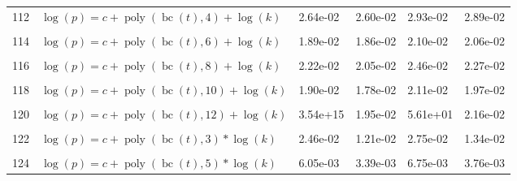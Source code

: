 \documentclass[12pt,a4paper]{article}
\DeclareMathOperator{\bc}{bc}
\DeclareMathOperator{\poly}{poly}
\begin{document}
\begin{longtable}[t]{ll>{\raggedleft\arraybackslash}p{2cm}>{\raggedleft\arraybackslash}p{2cm}>{\raggedleft\arraybackslash}p{2cm}>{\raggedleft\arraybackslash}p{2cm}}
112 & $\log(p) = c + \poly\left( \bc(t), 4 \right) + \log(k)$ & 2.64e-02 & 2.60e-02 & 2.93e-02 & 2.89e-02\\
\cellcolor{gray!6}{113} & \cellcolor{gray!6}{$\log(p) = c + \poly\left( \bc(t), 5 \right) + \log(k)$} & \cellcolor{gray!6}{2.09e-02} & \cellcolor{gray!6}{1.85e-02} & \cellcolor{gray!6}{2.32e-02} & \cellcolor{gray!6}{2.05e-02}\\
114 & $\log(p) = c + \poly\left( \bc(t), 6 \right) + \log(k)$ & 1.89e-02 & 1.86e-02 & 2.10e-02 & 2.06e-02\\
\cellcolor{gray!6}{115} & \cellcolor{gray!6}{$\log(p) = c + \poly\left( \bc(t), 7 \right) + \log(k)$} & \cellcolor{gray!6}{1.44e+00} & \cellcolor{gray!6}{2.40e-02} & \cellcolor{gray!6}{1.60e+00} & \cellcolor{gray!6}{2.66e-02}\\
116 & $\log(p) = c + \poly\left( \bc(t), 8 \right) + \log(k)$ & 2.22e-02 & 2.05e-02 & 2.46e-02 & 2.27e-02\\
\cellcolor{gray!6}{117} & \cellcolor{gray!6}{$\log(p) = c + \poly\left( \bc(t), 9 \right) + \log(k)$} & \cellcolor{gray!6}{1.87e-02} & \cellcolor{gray!6}{1.78e-02} & \cellcolor{gray!6}{2.07e-02} & \cellcolor{gray!6}{1.96e-02}\\
118 & $\log(p) = c + \poly\left( \bc(t), 10 \right) + \log(k)$ & 1.90e-02 & 1.78e-02 & 2.11e-02 & 1.97e-02\\
\cellcolor{gray!6}{119} & \cellcolor{gray!6}{$\log(p) = c + \poly\left( \bc(t), 11 \right) + \log(k)$} & \cellcolor{gray!6}{2.11e-02} & \cellcolor{gray!6}{1.99e-02} & \cellcolor{gray!6}{2.34e-02} & \cellcolor{gray!6}{2.21e-02}\\
120 & $\log(p) = c + \poly\left( \bc(t), 12 \right) + \log(k)$ & 3.54e+15 & 1.95e-02 & 5.61e+01 & 2.16e-02\\
\cellcolor{gray!6}{121} & \cellcolor{gray!6}{$\log(p) = c + \poly\left( \bc(t), 13 \right) + \log(k)$} & \cellcolor{gray!6}{3.75e+20} & \cellcolor{gray!6}{1.79e-02} & \cellcolor{gray!6}{2.01e-02} & \cellcolor{gray!6}{1.98e-02}\\
122 & $\log(p) = c + \poly\left( \bc(t), 3 \right) * \log(k)$ & 2.46e-02 & 1.21e-02 & 2.75e-02 & 1.34e-02\\
\cellcolor{gray!6}{123} & \cellcolor{gray!6}{$\log(p) = c + \poly\left( \bc(t), 4 \right) * \log(k)$} & \cellcolor{gray!6}{1.68e-02} & \cellcolor{gray!6}{1.63e-02} & \cellcolor{gray!6}{1.88e-02} & \cellcolor{gray!6}{1.82e-02}\\
124 & $\log(p) = c + \poly\left( \bc(t), 5 \right) * \log(k)$ & 6.05e-03 & 3.39e-03 & 6.75e-03 & 3.76e-03\\

\end{longtable}
\end{document}
